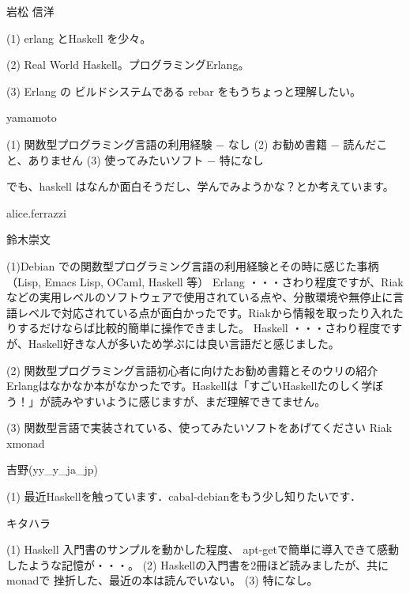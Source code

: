 

\begin{prework}{ 岩松 信洋 }

(1) erlang とHaskell を少々。

(2) Real World Haskell。プログラミングErlang。

(3) Erlang の ビルドシステムである rebar をもうちょっと理解したい。


\end{prework}

\begin{prework}{ yamamoto }

(1) 関数型プログラミング言語の利用経験 − なし
(2) お勧め書籍 − 読んだこと、ありません
(3) 使ってみたいソフト − 特になし

でも、haskell はなんか面白そうだし、学んでみようかな？とか考えています。
\end{prework}

\begin{prework}{ alice.ferrazzi }


\end{prework}

\begin{prework}{ 鈴木崇文 }

(1)Debian での関数型プログラミング言語の利用経験とその時に感じた事柄（Lisp, Emacs Lisp, OCaml, Haskell 等）
Erlang ・・・さわり程度ですが、Riakなどの実用レベルのソフトウェアで使用されている点や、分散環境や無停止に言語レベルで対応されている点が面白かったです。Riakから情報を取ったり入れたりするだけならば比較的簡単に操作できました。
Haskell ・・・さわり程度ですが、Haskell好きな人が多いため学ぶには良い言語だと感じました。

(2) 関数型プログラミング言語初心者に向けたお勧め書籍とそのウリの紹介
Erlangはなかなか本がなかったです。Haskellは「すごいHaskellたのしく学ぼう！」が読みやすいように感じますが、まだ理解できてません。

(3) 関数型言語で実装されている、使ってみたいソフトをあげてください
Riak
xmonad

\end{prework}

\begin{prework}{ 吉野(yy\_y\_ja\_jp) }

(1) 最近Haskellを触っています．cabal-debianをもう少し知りたいです．
\end{prework}

\begin{prework}{ キタハラ }

(1) Haskell 入門書のサンプルを動かした程度、
    apt-getで簡単に導入できて感動したような記憶が・・・。
(2) Haskellの入門書を2冊ほど読みましたが、共にmonadで
    挫折した、最近の本は読んでいない。
(3) 特になし。

\end{prework}

